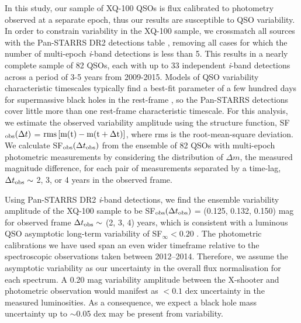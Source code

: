 \documentclass[fleqn,usenatbib]{mnras}
\begin{document}
In this study, our sample of XQ-100 QSOs is flux calibrated to photometry observed at a separate epoch, thus our results are susceptible to QSO variability. In order to constrain variability in the XQ-100 sample, we crossmatch all sources with the Pan-STARRS DR2 detections table \citep{Flewelling_2020}, removing all cases for which the number of multi-epoch \textit{i}-band detections is less than 5. This results in a nearly complete sample of 82 QSOs, each with up to 33 independent \textit{i}-band detections across a period of 3-5 years from 2009-2015. Models of QSO variability characteristic timescales typically find a best-fit parameter of a few hundred days for supermassive black holes in the rest-frame \citep[e.g.,][]{MacLeod_2010, Burke_2021, Suberlak_2021}, so the Pan-STARRS detections cover little more than one rest-frame characteristic timescale. For this analysis, we estimate the observed variability amplitude using the structure function, SF$_{\rm{obs}}(\Delta t)$ = $\rm{rms}\left[m(t) - m(t+\Delta t)\right]$, where rms is the root-mean-square deviation. We calculate SF$_{\rm{obs}}(\Delta t_{\rm{obs}})$ from the ensemble of 82 QSOs with multi-epoch photometric measurements by considering the distribution of $\Delta m$, the measured magnitude difference, for each pair of measurements separated by a time-lag, $\Delta t_{\rm{obs}} \sim$ 2, 3, or 4 years in the observed frame.

Using Pan-STARRS DR2 \textit{i}-band detections, we find the ensemble variability amplitude of the XQ-100 sample to be SF$_{\rm{obs}}(\Delta t_{\rm{obs}})$ = (0.125, 0.132, 0.150) mag for observed frame $\Delta t_{\rm{obs}} \sim$ (2, 3, 4) years, which is consistent with a luminous QSO asymptotic long-term variability of SF$_{\infty} < 0.20$ \citep{MacLeod_2010, Kozlowski_2016}. The photometric calibrations we have used span an even wider timeframe relative to the spectroscopic observations taken between 2012--2014. Therefore, we assume the asymptotic variability as our uncertainty in the overall flux normalisation for each spectrum. A 0.20 mag variability amplitude between the X-shooter and photometric observation would manifest as $< 0.1$ dex uncertainty in the measured luminosities. As a consequence, we expect a black hole mass uncertainty up to $\sim$0.05 dex may be present from variability. 
\end{document}
